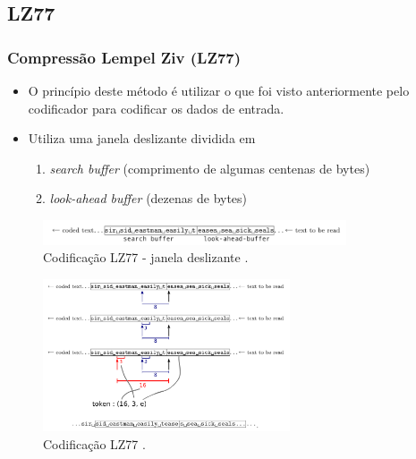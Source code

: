

\subsection{LZ77}

\begin{frame}[allowframebreaks]
  \frametitle{Compressão Lempel Ziv (LZ77)}
 
 
  \begin{itemize}
  \item O princípio deste método é utilizar o que foi visto anteriormente pelo codificador para codificar os dados de entrada.
  \item Utiliza uma janela deslizante dividida em
  \begin{enumerate}
  \item \textit{search buffer} (comprimento de algumas centenas de bytes)
  \item \textit{look-ahead buffer} (dezenas de bytes)
  \end{enumerate}
  \end{itemize}

  \begin{figure}[h!]
  \centering
  \includegraphics[width=0.8\textwidth]{images/sliding_window_lz77.png}
  \caption{Codificação LZ77 - janela deslizante \citep{salomon2007}.}
  \label{fig:sliding_window_lz77}
  \end{figure}

  \framebreak

  \begin{figure}[h!]
  \centering
  \includegraphics[width=0.65\textwidth]{images/lz77_schema.png}
  \caption{Codificação LZ77 \citep{salomon2007}.}
  \label{fig:lz77_schema}
  \end{figure}


\end{frame}
